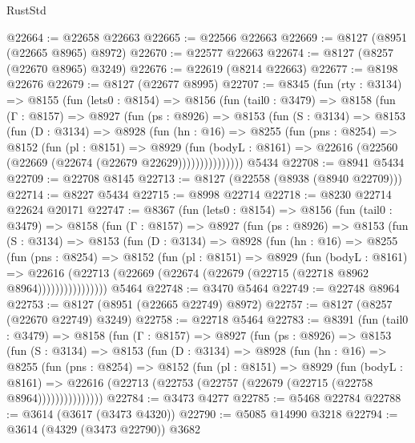 \begin{lexlean}{RustStd}
\begin{coremodule}
@22664 := @22658 @22663
@22665 := @22566 @22663
@22669 := @8127 (@8951 (@22665 @8965) @8972)
@22670 := @22577 @22663
@22674 := @8127 (@8257 (@22670 @8965) @3249)
@22676 := @22619 (@8214 @22663)
@22677 := @8198 @22676
@22679 := @8127 (@22677 @8995)
@22707 := @8345
    (fun (rty : @3134) =>
    @8155
      (fun (lets0 : @8154) =>
      @8156
        (fun (tail0 : @3479) =>
        @8158
          (fun (Γ : @8157) =>
          @8927
            (fun (ps : @8926) =>
            @8153
              (fun (S : @3134) =>
              @8153
                (fun (D : @3134) =>
                @8928
                  (fun (hn : @16) =>
                  @8255
                    (fun (pns : @8254) =>
                    @8152
                      (fun (pl : @8151) =>
                      @8929
                        (fun (bodyL : @8161) =>
                        @22616 (@22560 (@22669 (@22674 (@22679 @22629)))))))))))))))
    @5434
@22708 := @8941 @5434
@22709 := @22708 @8145
@22713 := @8127 (@22558 (@8938 (@8940 @22709)))
@22714 := @8227 @5434
@22715 := @8998 @22714
@22718 := @8230 @22714 @22624 @20171
@22747 := @8367
    (fun (lets0 : @8154) =>
    @8156
      (fun (tail0 : @3479) =>
      @8158
        (fun (Γ : @8157) =>
        @8927
          (fun (ps : @8926) =>
          @8153
            (fun (S : @3134) =>
            @8153
              (fun (D : @3134) =>
              @8928
                (fun (hn : @16) =>
                @8255
                  (fun (pns : @8254) =>
                  @8152
                    (fun (pl : @8151) =>
                    @8929
                      (fun (bodyL : @8161) =>
                      @22616
                        (@22713 (@22669 (@22674 (@22679 (@22715 (@22718 @8962 @8964))))))))))))))))
    @5464
@22748 := @3470 @5464
@22749 := @22748 @8964
@22753 := @8127 (@8951 (@22665 @22749) @8972)
@22757 := @8127 (@8257 (@22670 @22749) @3249)
@22758 := @22718 @5464
@22783 := @8391
    (fun (tail0 : @3479) =>
    @8158
      (fun (Γ : @8157) =>
      @8927
        (fun (ps : @8926) =>
        @8153
          (fun (S : @3134) =>
          @8153
            (fun (D : @3134) =>
            @8928
              (fun (hn : @16) =>
              @8255
                (fun (pns : @8254) =>
                @8152
                  (fun (pl : @8151) =>
                  @8929
                    (fun (bodyL : @8161) =>
                    @22616 (@22713 (@22753 (@22757 (@22679 (@22715 (@22758 @8964)))))))))))))))
@22784 := @3473 @4277
@22785 := @5468 @22784
@22788 := @3614 (@3617 (@3473 @4320))
@22790 := @5085 @14990 @3218
@22794 := @3614 (@4329 (@3473 @22790)) @3682

\end{coremodule}
\end{lexlean}
